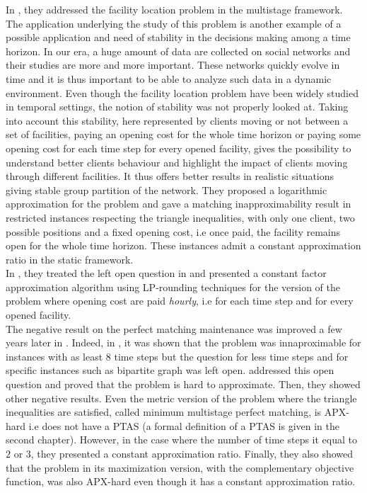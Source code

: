 \documentclass[a4paper]{book}
\begin{document}
In \cite{Eisenstat}, they addressed the {\sc facility location }problem in the multistage framework. The application underlying the study of this problem is another example of a possible application and need of stability in the decisions making among a time horizon. In our era, a huge amount of data are collected on social networks and their studies are more and more important. These networks quickly evolve in time and it is thus important to be able to analyze such data in a dynamic environment. Even though the {\sc facility location} problem have been widely studied in temporal settings, the notion of stability was not properly looked at. Taking into account this stability, here represented by clients moving or not between a set of facilities, paying an opening cost for the whole time horizon or paying some opening cost for each time step for every opened facility, gives the possibility to understand better clients behaviour and highlight the impact of clients moving through different facilities. It thus offers better results in realistic situations giving stable group partition of the network. They proposed a logarithmic approximation for the problem and gave a matching inapproximability result in restricted instances respecting the triangle inequalities, with only one client, two possible positions and a fixed opening cost, i.e once paid, the facility remains open for the whole time horizon. These instances admit a constant approximation ratio in the static framework. \\

In \cite{an2017dynamic}, they treated the left open question in \cite{Eisenstat} and presented a constant factor approximation algorithm using LP-rounding techniques for the version of the problem where opening cost are paid \textit{hourly}, i.e for each time step and for every opened facility.\\

The negative result on the {\sc perfect matching maintenance} was improved a few years later in \cite{bampis2018multistage}. Indeed, in \cite{Gupta}, it was shown that the problem was innaproximable for instances with as least $8$ time steps but the question for less time steps and for specific instances such as bipartite graph was left open. \cite{bampis2018multistage} addressed this open question and proved that the problem is hard to approximate. Then, they showed other negative results. Even the metric version of the problem where the triangle inequalities are satisfied, called {\sc minimum multistage perfect matching}, is APX-hard i.e does not have a PTAS (a formal definition of a PTAS is given in the second chapter). However, in the case where the number of time steps it equal to $2$ or $3$, they presented a constant approximation ratio. Finally, they also showed that the problem in its maximization version, with the complementary objective function, was also APX-hard even though it has a constant approximation ratio. \\
\end{document}
